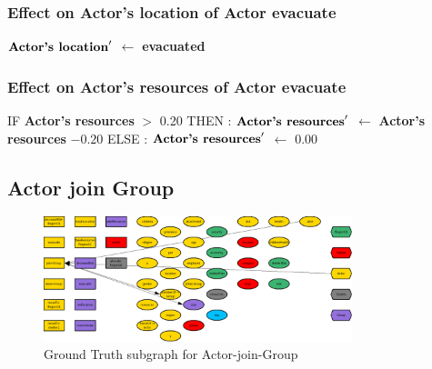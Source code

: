 \documentclass{article}%
\begin{document}
%
\subsubsection{Effect on Actor's location of Actor evacuate}%
\label{ssubsec:Effect on Actor's location of Actor evacuate}%
\begin{flushleft}%
$\mbox{\textbf{Actor's location}} '$%
$\leftarrow$%
\textbf{evacuated}%
\end{flushleft}

%
\subsubsection{Effect on Actor's resources of Actor evacuate}%
\label{ssubsec:Effect on Actor's resources of Actor evacuate}%
\begin{flushleft}%
IF %
\textbf{Actor's resources}%
$>$%
0.20%
\linebreak%
\hspace*{2em}%
THEN %
: %
$\mbox{\textbf{Actor's resources}} '$%
$\leftarrow$%
\textbf{Actor's resources}%
${-}0.20$%
\linebreak%
\hspace*{2em}%
ELSE %
: %
$\mbox{\textbf{Actor's resources}} '$%
$\leftarrow$%
0.00%
\end{flushleft}

%
\subsection{Actor join Group}%
\label{subsec:Actor join Group}%


\begin{figure}[ht]%
\centering%
\includegraphics[width=0.8\textwidth]{images/Actor-join-Group.png}%
\caption{Ground Truth subgraph for Actor{-}join{-}Group}%
\end{figure}

%
\end{document}
